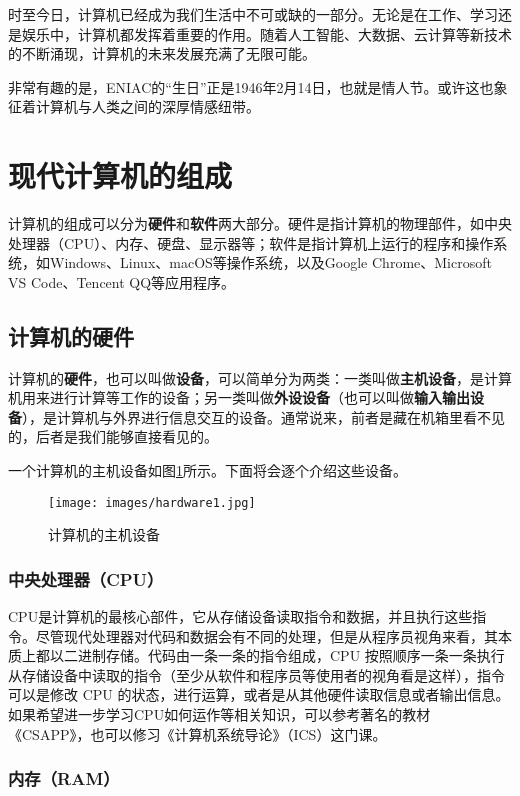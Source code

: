 \documentclass[../main.tex]{subfiles}
\begin{document}
时至今日，计算机已经成为我们生活中不可或缺的一部分。无论是在工作、学习还是娱乐中，计算机都发挥着重要的作用。随着人工智能、大数据、云计算等新技术的不断涌现，计算机的未来发展充满了无限可能。

非常有趣的是，ENIAC的“生日”正是1946年2月14日，也就是情人节。或许这也象征着计算机与人类之间的深厚情感纽带。

\section{现代计算机的组成}

计算机的组成可以分为\textbf{硬件}和\textbf{软件}两大部分。硬件是指计算机的物理部件，如中央处理器（CPU）、内存、硬盘、显示器等；软件是指计算机上运行的程序和操作系统，如Windows、Linux、macOS等操作系统，以及Google Chrome、Microsoft VS Code、Tencent QQ等应用程序。

\subsection{计算机的硬件}

计算机的\textbf{硬件}，也可以叫做\textbf{设备}，可以简单分为两类：一类叫做\textbf{主机设备}，是计算机用来进行计算等工作的设备；另一类叫做\textbf{外设设备}（也可以叫做\textbf{输入输出设备}），是计算机与外界进行信息交互的设备。通常说来，前者是藏在机箱里看不见的，后者是我们能够直接看见的。

一个计算机的主机设备如图\ref{fig:computer-hardware}所示。下面将会逐个介绍这些设备。
\begin{figure}[ht]
  \centering
  \texttt{[image: images/hardware1.jpg]}
  \caption{计算机的主机设备}
  \label{fig:computer-hardware}
\end{figure}

\subsubsection{中央处理器（CPU）}

CPU是计算机的最核心部件，它从存储设备读取指令和数据，并且执行这些指令。尽管现代处理器对代码和数据会有不同的处理，但是从程序员视角来看，其本质上都以二进制存储。代码由一条一条的指令组成，CPU 按照顺序一条一条执行从存储设备中读取的指令（至少从软件和程序员等使用者的视角看是这样），指令可以是修改 CPU 的状态，进行运算，或者是从其他硬件读取信息或者输出信息。如果希望进一步学习CPU如何运作等相关知识，可以参考著名的教材《CSAPP》，也可以修习《计算机系统导论》（ICS）这门课。

\subsubsection{内存（RAM）}
\end{document}
